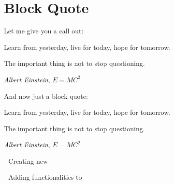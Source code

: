 \documentclass[10pt]{report}
\begin{document}
\chapter{Block Quote}\label{ch:Block Quote}

Let me give you a call out:

\begin{tcolorbox}[title=Quote of the day
]
Learn from yesterday, live for today, hope for tomorrow.

The important thing is not to stop questioning.

\textit{Albert Einstein}, $E=MC^2$

\end{tcolorbox}


And now just a block quote:

\begin{advtcolorbox}
Learn from yesterday, live for today, hope for tomorrow.

The important thing is not to stop questioning.

\textit{Albert Einstein}, $E=MC^2$

\end{advtcolorbox}


\begin{tcolorbox}[title=A more complex callout
]
- Creating  new

- Adding functionalities to 
\end{tcolorbox}
\end{document}
